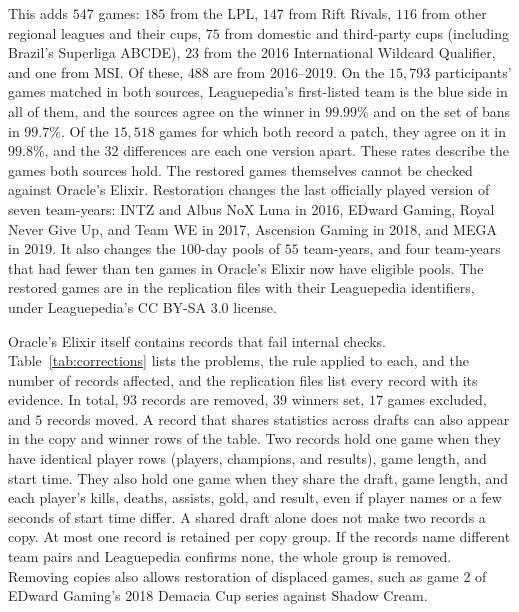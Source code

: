 \documentclass[11pt]{article}
\begin{document}
This adds $547$ games: $185$ from the LPL, $147$ from Rift Rivals, $116$ from other regional leagues and their cups, $75$ from domestic and third-party cups (including Brazil's Superliga ABCDE), $23$ from the 2016 International Wildcard Qualifier, and one from MSI. Of these, $488$ are from 2016--2019. On the $15{,}793$ participants' games matched in both sources, Leaguepedia's first-listed team is the blue side in all of them, and the sources agree on the winner in $99.99\%$ and on the set of bans in $99.7\%$. Of the $15{,}518$ games for which both record a patch, they agree on it in $99.8\%$, and the $32$ differences are each one version apart. These rates describe the games both sources hold. The restored games themselves cannot be checked against Oracle's Elixir. Restoration changes the last officially played version of seven team-years: INTZ and Albus NoX Luna in 2016, EDward Gaming, Royal Never Give Up, and Team WE in 2017, Ascension Gaming in 2018, and MEGA in 2019. It also changes the $100$-day pools of $55$ team-years, and four team-years that had fewer than ten games in Oracle's Elixir now have eligible pools. The restored games are in the replication files with their Leaguepedia identifiers, under Leaguepedia's CC BY-SA 3.0 license.

Oracle's Elixir itself contains records that fail internal checks. Table~\ref{tab:corrections} lists the problems, the rule applied to each, and the number of records affected, and the replication files list every record with its evidence. In total, $93$ records are removed, $39$ winners set, $17$ games excluded, and $5$ records moved. A record that shares statistics across drafts can also appear in the copy and winner rows of the table. Two records hold one game when they have identical player rows (players, champions, and results), game length, and start time. They also hold one game when they share the draft, game length, and each player's kills, deaths, assists, gold, and result, even if player names or a few seconds of start time differ. A shared draft alone does not make two records a copy. At most one record is retained per copy group. If the records name different team pairs and Leaguepedia confirms none, the whole group is removed. Removing copies also allows restoration of displaced games, such as game 2 of EDward Gaming's 2018 Demacia Cup series against Shadow Cream.
\end{document}
